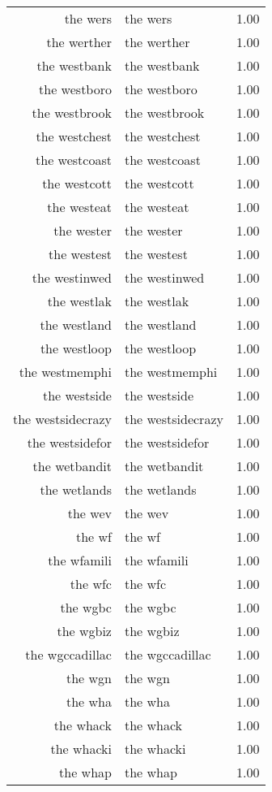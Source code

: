 \begin{table}[ht]
\begin{tabular}{rlr}
  the wers & the wers & 1.00 \\ 
  the werther & the werther & 1.00 \\ 
  the westbank & the westbank & 1.00 \\ 
  the westboro & the westboro & 1.00 \\ 
  the westbrook & the westbrook & 1.00 \\ 
  the westchest & the westchest & 1.00 \\ 
  the westcoast & the westcoast & 1.00 \\ 
  the westcott & the westcott & 1.00 \\ 
  the westeat & the westeat & 1.00 \\ 
  the wester & the wester & 1.00 \\ 
  the westest & the westest & 1.00 \\ 
  the westinwed & the westinwed & 1.00 \\ 
  the westlak & the westlak & 1.00 \\ 
  the westland & the westland & 1.00 \\ 
  the westloop & the westloop & 1.00 \\ 
  the westmemphi & the westmemphi & 1.00 \\ 
  the westside & the westside & 1.00 \\ 
  the westsidecrazy & the westsidecrazy & 1.00 \\ 
  the westsidefor & the westsidefor & 1.00 \\ 
  the wetbandit & the wetbandit & 1.00 \\ 
  the wetlands & the wetlands & 1.00 \\ 
  the wev & the wev & 1.00 \\ 
  the wf & the wf & 1.00 \\ 
  the wfamili & the wfamili & 1.00 \\ 
  the wfc & the wfc & 1.00 \\ 
  the wgbc & the wgbc & 1.00 \\ 
  the wgbiz & the wgbiz & 1.00 \\ 
  the wgccadillac & the wgccadillac & 1.00 \\ 
  the wgn & the wgn & 1.00 \\ 
  the wha & the wha & 1.00 \\ 
  the whack & the whack & 1.00 \\ 
  the whacki & the whacki & 1.00 \\ 
  the whap & the whap & 1.00 \\ 

\end{tabular}
\end{table}
